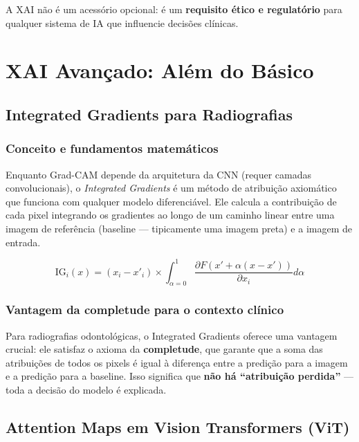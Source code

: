A XAI não é um acessório opcional: é um \textbf{requisito ético e
regulatório} para qualquer sistema de IA que influencie decisões
clínicas.

\section{XAI Avançado: Além do Básico}

\subsection{Integrated Gradients para Radiografias}

\subsubsection{Conceito e fundamentos matemáticos}

Enquanto Grad-CAM depende da arquitetura da CNN (requer camadas
convolucionais), o \textit{Integrated Gradients} \cite{sundararajan2017axiomatic}
é um método de atribuição axiomático que funciona com qualquer modelo
diferenciável. Ele calcula a contribuição de cada pixel integrando os
gradientes ao longo de um caminho linear entre uma imagem de referência
(baseline — tipicamente uma imagem preta) e a imagem de entrada.

\begin{equation}
  \text{IG}_{i}(x) = (x_{i} - x'_{i}) \times \int_{\alpha=0}^{1}
  \frac{\partial F(x' + \alpha(x - x'))}{\partial x_{i}} d\alpha
  \label{eq:integrated-gradients}
\end{equation}

\subsubsection{Vantagem da completude para o contexto clínico}

Para radiografias odontológicas, o Integrated Gradients oferece uma
vantagem crucial: ele satisfaz o axioma da \textbf{completude}, que
garante que a soma das atribuições de todos os pixels é igual à
diferença entre a predição para a imagem e a predição para a baseline.
Isso significa que \textbf{não há ``atribuição perdida''} — toda a
decisão do modelo é explicada.

\subsection{Attention Maps em Vision Transformers (ViT)}

